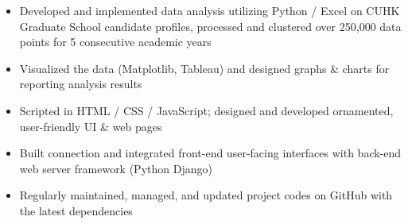 \documentclass[cmu]{resume}
\begin{document}
    \begin{itemize}
        \item Developed and implemented data analysis utilizing  Python / Excel on CUHK Graduate School candidate profiles, processed and clustered over 250,000 data points for 5 consecutive academic years
        \item Visualized the data (Matplotlib, Tableau) and designed graphs \& charts for reporting analysis results
    \end{itemize}

    \begin{itemize}
        \item Scripted in HTML / CSS / JavaScript; designed and developed ornamented, user-friendly UI \& web pages
        \item Built connection and integrated front-end user-facing interfaces with back-end web server framework (Python Django)
        \item Regularly maintained, managed, and updated project codes on GitHub with the latest dependencies
    \end{itemize}

\end{document}
